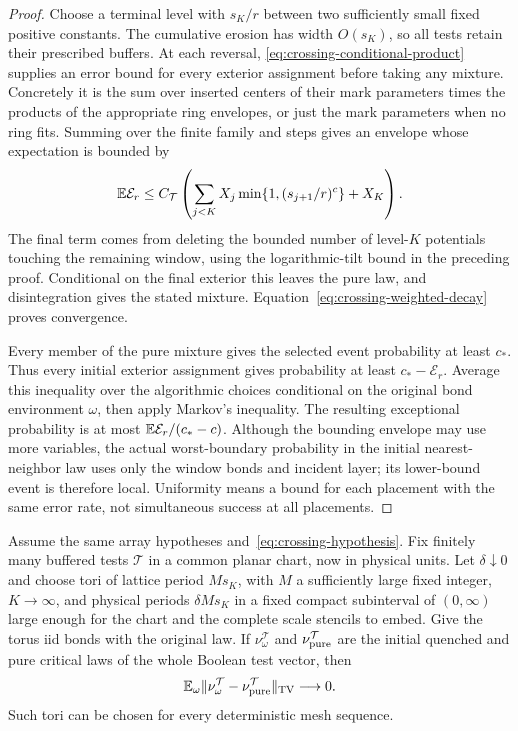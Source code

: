 \begin{proof}
Choose a terminal level with $s_K/r$ between two sufficiently small
fixed positive constants.  The cumulative erosion has width $O(s_K)$,
so all tests retain their prescribed buffers.  At each reversal,
\eqref{eq:crossing-conditional-product} supplies an error bound for
every exterior assignment before taking any mixture.  Concretely it is
the sum over inserted centers of their mark parameters times the
products of the appropriate ring envelopes, or just the mark parameters
when no ring fits.  Summing over the finite family and steps gives an
envelope whose expectation is bounded by
\begin{equation}
 \mathbb E\mathcal E_r\leq C_{\mathcal T}
 \left(\sum_{j<K}X_j\min\{1,(s_{j+1}/r)^c\}+X_K\right).
 \label{eq:crossing-local-error}
\end{equation}
The final term comes from deleting the bounded number of level-$K$
potentials touching the remaining window, using the logarithmic-tilt
bound in the preceding proof.  Conditional on the final exterior this
leaves the pure law, and disintegration gives the stated mixture.
Equation~\eqref{eq:crossing-weighted-decay} proves convergence.

Every member of the pure mixture gives the selected event probability
at least $c_*$.  Thus every initial exterior assignment gives probability
at least $c_*-\mathcal E_r$.  Average this inequality over the algorithmic
choices conditional on the original bond environment $\omega$, then
apply Markov's inequality.  The resulting exceptional probability is
at most $\mathbb E\mathcal E_r/(c_*-c)$.  Although the bounding envelope may use
more variables, the actual worst-boundary probability in the initial
nearest-neighbor law uses only the window bonds and incident layer;
its lower-bound event is therefore local.  Uniformity means a bound for
each placement with the same error rate, not simultaneous success at
all placements.
\end{proof}

\begin{proposition}
\label{prop:torus-tests}
Assume the same array hypotheses and~\eqref{eq:crossing-hypothesis}.
Fix finitely many buffered tests $\mathcal T$ in a common planar chart,
now in physical units.  Let $\delta\downarrow0$ and choose tori of lattice
period $Ms_K$, with $M$ a sufficiently large fixed integer, $K\to\infty$,
and physical periods $\delta Ms_K$ in a fixed compact subinterval of
$(0,\infty)$ large enough for the chart and the complete scale stencils
to embed.  Give the torus iid bonds with the original law.  If
$\nu_{\omega}^{\mathcal T}$ and $\nu_{\rm pure}^{\mathcal T}$ are the
initial quenched and pure critical laws of the whole Boolean test vector,
then
\begin{equation}
 \mathbb E_{\omega}\|\nu_{\omega}^{\mathcal T}
                     -\nu_{\rm pure}^{\mathcal T}\|_{\operatorname{TV}}\longrightarrow0.
 \label{eq:crossing-torus-tv}
\end{equation}
Such tori can be chosen for every deterministic mesh sequence.
\end{proposition}

